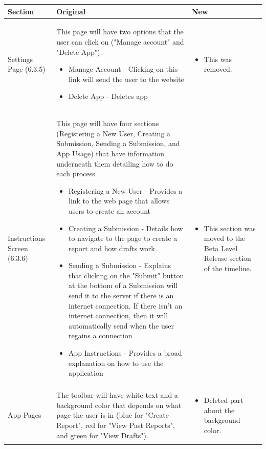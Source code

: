 \documentclass[onecolumn, draftclsnofoot,10pt, compsoc]{IEEEtran}
\begin{document}
\begin{table}
\begin{tabularx}{\textwidth}{|>{\setlength\hsize{.8\hsize}\setlength\linewidth{\hsize}}X|>{\setlength\hsize{1.1\hsize}\setlength\linewidth{\hsize}}X|>{\setlength\hsize{1.1\hsize}\setlength\linewidth{\hsize}}X|}
\hline
Section & Original & New \\

\hline
Settings Page (6.3.5) 
&
This page will have two options that the user can click on ("Manage account" and "Delete App").
\begin{itemize}
\item Manage Account - Clicking on this link will send the user to the website
\item Delete App - Deletes app 
\end{itemize}
&
\begin{itemize}
    \item This was removed.
\end{itemize}
 \\

\hline
Instructions Screen (6.3.6)
&
This page will have four sections (Registering a New User, Creating a Submission, Sending a Submission, and App Usage) that have information underneath them detailing how to do each process
\begin{itemize}

\item Registering a New User - Provides a link to the web page that allows users to create an account
\item Creating a Submission - Details how to navigate to the page to create a report and how drafts work 
\item Sending a Submission - Explains that clicking on the "Submit" button at the bottom of a Submission will send it to the server if there is an internet connection. If there isn't an internet connection, then it will automatically send when the user regains a connection 
\item App Instructions - Provides a broad explanation on how to use the application
\end{itemize}
&
\begin{itemize}
    \item This section was moved to the Beta Level Release section of the timeline.
\end{itemize}
 \\
\hline

App Pages
&
The toolbar will have white text and a background color that depends on what page the user is in (blue for "Create Report", red for "View Past Reports", and green for "View Drafts").
&
\begin{itemize}
    \item Deleted part about the background color.
\end{itemize}
 \\

\hline


\end{tabularx}
\end{table}
\end{document}
